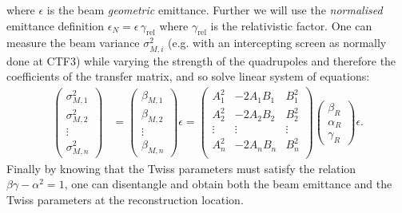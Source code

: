 %
where $\epsilon$ is the beam \emph{geometric} emittance.
Further we will use the \emph{normalised}
emittance definition $\epsilon_N = \epsilon \, \gamma_{\text{rel}}$
where $\gamma_{\text{rel}}$ is the relativistic factor. 
%
One can measure the beam variance $\sigma_{M,i}^2$ (e.g. with an
intercepting screen as normally done at CTF3)
while varying the strength of the quadrupoles and therefore the
coefficients of the transfer matrix, 
and so solve linear system of equations:
%
\begin{align}
\begin{pmatrix}
\sigma_{M,1}^2 \\
\sigma_{M,2}^2 \\
\vdots \\
\sigma_{M,n}^2
\end{pmatrix}
&=
\begin{pmatrix}
\beta_{M,1} \\
\beta_{M,2} \\
\vdots \\
\beta_{M,n}
\end{pmatrix}
\epsilon 
= 
 \begin{pmatrix}
  A_1^2 & -2A_1B_1 & B_1^2 \\
  A_2^2 & -2A_2B_2 & B_2^2 \\
  \vdots & \vdots & \vdots \\
  A_n^2 & -2A_nB_n & B_n^2 \\
  \end{pmatrix} 
\begin{pmatrix}
  \beta_R \\
  \alpha_R \\
  \gamma_R
\end{pmatrix}
\epsilon.
\label{eq:dataCollectionQuadscan}
\end{align}
%
Finally by knowing that the Twiss parameters must satisfy the relation
$\beta\gamma - \alpha^2 = 1$, one can disentangle and obtain both the
beam emittance and the Twiss parameters at the reconstruction location.


